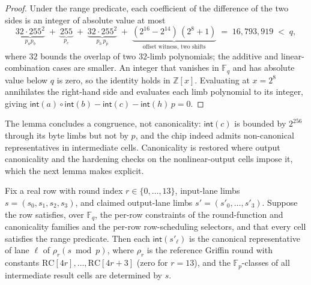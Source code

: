 \begin{proof}
Under the range predicate, each coefficient of the difference of the two sides is an integer of absolute value at most
    \[
      \underbrace{32\cdot 255^{2}}_{p_a p_b}
      \;+\; \underbrace{255}_{p_c}
      \;+\; \underbrace{32\cdot 255^{2}}_{p_h\,p_{\bar p}}
      \;+\; \underbrace{(2^{16}-2^{14})\,(2^{8}+1)}_{\text{offset witness, two shifts}}
      \;=\; 16{,}793{,}919 \;<\; q,
    \]
where $32$ bounds the overlap of two $32$-limb polynomials; the additive and linear-combination cases are smaller. An integer that vanishes in $\mathbb{F}_q$ and has absolute value below $q$ is zero, so the identity holds in $\mathbb{Z}[x]$. Evaluating at $x = 2^{8}$ annihilates the right-hand side and evaluates each limb polynomial to its integer, giving $\mathsf{int}(a)\circ\mathsf{int}(b) - \mathsf{int}(c) - \mathsf{int}(h)\,p = 0$.
\end{proof}

The lemma concludes a congruence, not canonicality: $\mathsf{int}(c)$ is bounded by $2^{256}$ through its byte limbs but not by $p$, and the chip indeed admits non-canonical representatives in intermediate cells. Canonicality is restored where output canonicality and the hardening checks on the nonlinear-output cells impose it, which the next lemma makes explicit.

\begin{lemma}\label{lem:round-fn}
Fix a real row with round index $r\in\{0,\dots,13\}$, input-lane limbs $s=(s_0,s_1,s_2,s_3)$, and claimed output-lane limbs $s'=(s'_0,\dots,s'_3)$. Suppose the row satisfies, over $\mathbb{F}_q$, the per-row constraints of the round-function and canonicality families and the per-row row-scheduling selectors, and that every cell satisfies the range predicate. Then each $\mathsf{int}(s'_\ell)$ is the canonical representative of lane $\ell$ of $\rho_r(s \bmod p)$, where $\rho_r$ is the reference Griffin round with constants $\mathrm{RC}[4r],\dots,\mathrm{RC}[4r{+}3]$ (zero for $r=13$), and the $\mathbb{F}_p$-classes of all intermediate result cells are determined by $s$.
\end{lemma}

